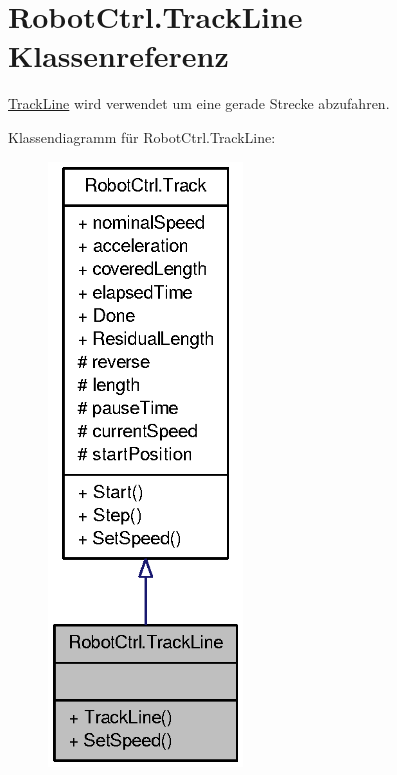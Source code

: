 \hypertarget{class_robot_ctrl_1_1_track_line}{
\section{RobotCtrl.TrackLine Klassenreferenz}
\label{class_robot_ctrl_1_1_track_line}
}


\hyperlink{class_robot_ctrl_1_1_track_line}{TrackLine} wird verwendet um eine gerade Strecke abzufahren.  




Klassendiagramm für RobotCtrl.TrackLine:\nopagebreak
\begin{figure}[H]
\begin{center}
\leavevmode
\includegraphics[width=146pt]{class_robot_ctrl_1_1_track_line__inherit__graph}
\end{center}
\end{figure}


